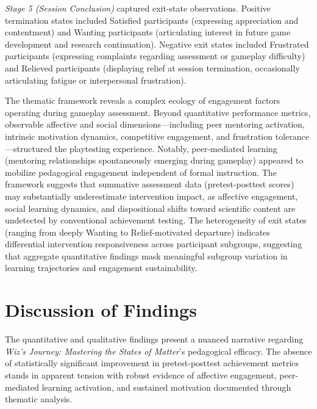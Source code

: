 \textit{Stage 5 (Session Conclusion)} captured exit-state observations. Positive termination states included Satisfied participants (expressing appreciation and contentment) and Wanting participants (articulating interest in future game development and research continuation). Negative exit states included Frustrated participants (expressing complaints regarding assessment or gameplay difficulty) and Relieved participants (displaying relief at session termination, occasionally articulating fatigue or interpersonal frustration).

The thematic framework reveals a complex ecology of engagement factors operating during gameplay assessment. Beyond quantitative performance metrics, observable affective and social dimensions---including peer mentoring activation, intrinsic motivation dynamics, competitive engagement, and frustration tolerance---structured the playtesting experience. Notably, peer-mediated learning (mentoring relationships spontaneously emerging during gameplay) appeared to mobilize pedagogical engagement independent of formal instruction. The framework suggests that summative assessment data (pretest-posttest scores) may substantially underestimate intervention impact, as affective engagement, social learning dynamics, and dispositional shifts toward scientific content are undetected by conventional achievement testing. The heterogeneity of exit states (ranging from deeply Wanting to Relief-motivated departure) indicates differential intervention responsiveness across participant subgroups, suggesting that aggregate quantitative findings mask meaningful subgroup variation in learning trajectories and engagement sustainability.

\section{Discussion of Findings}

The quantitative and qualitative findings present a nuanced narrative regarding \textit{Wiz's Journey: Mastering the States of Matter}'s pedagogical efficacy. The absence of statistically significant improvement in pretest-posttest achievement metrics stands in apparent tension with robust evidence of affective engagement, peer-mediated learning activation, and sustained motivation documented through thematic analysis.

